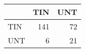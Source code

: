 \begin{tabular}{lrr}
\hline
     &   TIN &   UNT \\
\hline
 TIN &   141 &    72 \\
 UNT &     6 &    21 \\
\hline
\end{tabular}